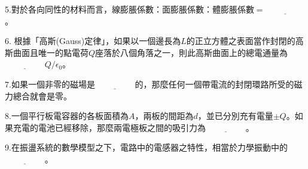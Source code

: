 \documentclass[cn,10pt,math=newtx]{elegantbook}
\begin{document}
\newpage


\begin{example}
   5.對於各向同性的材料而言，線膨脹係數：面膨脹係數：體膨脹係數$ = \underline{\hspace{2cm}}$。\\
    \rightline{[桃園聯招教甄109]}
\end{example}
\begin{solution}
    
\end{solution}

\newpage



\begin{example}
   6. 根據「高斯(Gauss)定律」，如果以一個邊長為$L$的正立方體之表面當作封閉的高斯曲面且唯一的點電荷$Q$座落於八個角落之一，則此高斯曲面上的總電通量為$\underline{\hspace{2cm}} Q /\epsilon_0$。\\
    \rightline{[桃園聯招教甄109]}
\end{example}
\begin{solution}
    
\end{solution}

\newpage


\begin{example}
   7.如果一個非零的磁場是$\underline{\hspace{2cm}}$的，那麼任何一個帶電流的封閉環路所受的磁力總合就會是零。\\
    \rightline{[桃園聯招教甄109]}
\end{example}
\begin{solution}
    
\end{solution}

\newpage


\begin{example}
   8.一個平行板電容器的各板面積為$A$，兩板的間距為$d$，並已分別充有電量$\pm Q$。如果充電的電池已經移除，那麼兩電極板之間的吸引力為$\underline{\hspace{2cm}}$。\\
    \rightline{[桃園聯招教甄109]}
\end{example}
\begin{solution}
    
\end{solution}

\newpage


\begin{example}
   9.在振盪系統的數學模型之下，電路中的電感器之特性，相當於力學振動中的$\underline{\hspace{2cm}}$。\\
    \rightline{[桃園聯招教甄109]}
\end{example}
\begin{solution}
    
\end{solution}
\end{document}

